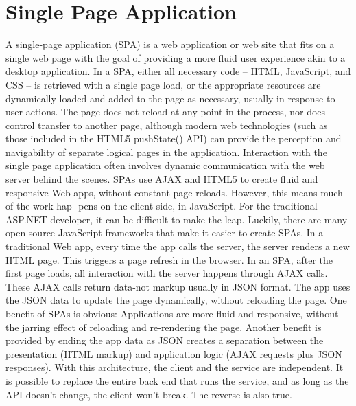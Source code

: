 \section{Single Page Application}
\label{sec:single_page_application}

A single-page application (SPA) is a web application or web site that fits on a single web page with the goal of providing a more fluid user experience akin to a desktop application. In a SPA, either all necessary code – HTML, JavaScript, and CSS – is retrieved with a single page load,\cite{arc_asp} or the appropriate resources are dynamically loaded and added to the page as necessary, usually in response to user actions. The page does not reload at any point in the process, nor does control transfer to another page, although modern web technologies (such as those included in the HTML5 pushState() API) can provide the perception and navigability of separate logical pages in the application. Interaction with the single page application often involves dynamic communication with the web server behind the scenes.
\newline
SPAs use AJAX and HTML5 to create fluid and responsive Web apps, without constant page reloads. However, this means much of the work hap- pens on the client side, in JavaScript. For the traditional ASP.NET developer, it can be difficult to make the leap. Luckily, there are many open source JavaScript frameworks that make it easier to create SPAs.
\newline
In a traditional Web app, every time the app calls the server, the server renders a new HTML page. This triggers a page refresh in the browser.
\newline
In an SPA, after the first page loads, all interaction with the server happens through AJAX calls. These AJAX calls return data-not markup usually in JSON format. The app uses the JSON data to update the page dynamically, without reloading the page.
\newline
One benefit of SPAs is obvious: Applications are more fluid and responsive, without the jarring effect of reloading and re-rendering the page. Another benefit is provided by ending the app data as JSON creates a separation between the presentation (HTML markup) and application logic (AJAX requests plus JSON responses). With this architecture, the client and the service are independent. It is possible to replace the entire back end that runs the service, and as long as the API doesn’t change, the client won’t break. The reverse is also true.